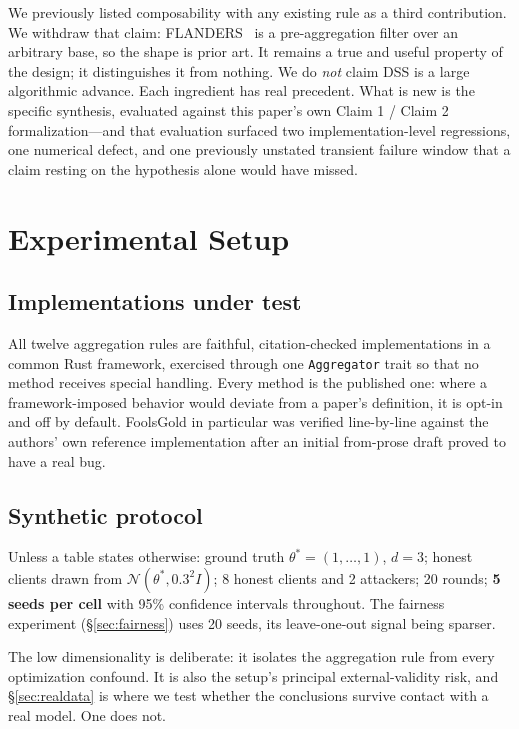 \documentclass[11pt,a4paper]{article}
\newcommand{\code}[1]{\texttt{\small #1}}
\begin{document}
We previously listed composability with any existing rule as a third
contribution. We withdraw that claim: FLANDERS~\cite{gabrielli2024} is a
pre-aggregation filter over an arbitrary base, so the shape is prior art.
It remains a true and useful property of the design; it distinguishes it
from nothing. We do \emph{not} claim DSS is a large algorithmic advance.
Each ingredient has real precedent. What is new is the specific synthesis,
evaluated against this paper's own Claim 1 / Claim 2 formalization---and
that evaluation surfaced two implementation-level regressions, one
numerical defect, and one previously unstated transient failure window
that a claim resting on the hypothesis alone would have missed.

\section{Experimental Setup}
\label{sec:setup}

\subsection{Implementations under test}

All twelve aggregation rules are faithful, citation-checked
implementations in a common Rust framework, exercised through one
\code{Aggregator} trait so that no method receives special handling. Every
method is the published one: where a framework-imposed behavior would
deviate from a paper's definition, it is opt-in and off by default.
FoolsGold in particular was verified line-by-line against the authors'
own reference implementation after an initial from-prose draft proved to
have a real bug.

\subsection{Synthetic protocol}

Unless a table states otherwise: ground truth $\theta^{*} = (1,\dots,1)$,
$d = 3$; honest clients drawn from $\mathcal{N}(\theta^{*}, 0.3^2 I)$; 8
honest clients and 2 attackers; 20 rounds; \textbf{5 seeds per cell} with
95\% confidence intervals throughout. The fairness experiment
(\S\ref{sec:fairness}) uses 20 seeds, its leave-one-out signal being
sparser.

The low dimensionality is deliberate: it isolates the aggregation rule
from every optimization confound. It is also the setup's principal
external-validity risk, and \S\ref{sec:realdata} is where we test whether
the conclusions survive contact with a real model. One does not.
\end{document}
